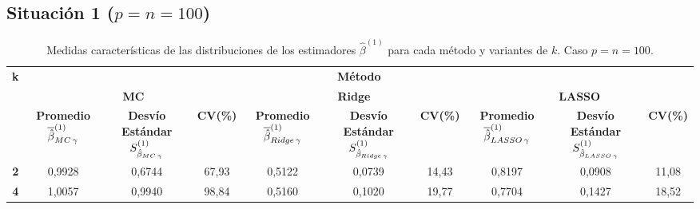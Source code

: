 \documentclass[a4paper,12pt]{report}
\begin{document}
\subsection*{Situación 1 ($p=n=100$)}
\begin{table}[H]
\centering
\caption{Medidas características de las distribuciones de los estimadores $\hat{\beta}^{(1)}$ para cada método y variantes de $k$. Caso $p=n=100$.}
\label{tab: sit 1 B 1 med std}
\footnotesize
\begin{tabular}{c|ccc|ccc|ccc}
 \multirow{3}{*}[-2em]{\textbf{k}} & \multicolumn{9}{c}{\textbf{Método}} \\[2ex]
 & \multicolumn{3}{c}{\textbf{MC}} & \multicolumn{3}{c}{\textbf{Ridge}} & \multicolumn{3}{c}{\textbf{LASSO}} \\[2ex]
 & \scriptsize\makecell{\textbf{Promedio} \\ $\overline{\hat{\beta}}_{MC \hspace{0.05cm} \gamma}^{(1)}$} & \scriptsize\makecell{\textbf{Desvío} \\ \textbf{Estándar} \\ $S_{\hat{\beta}_{MC \hspace{0.05cm} \gamma}}^{(1)}$} & \scriptsize\textbf{CV(\%)} & \scriptsize\makecell{\textbf{Promedio} \\ $\overline{\hat{\beta}}_{Ridge \hspace{0.05cm} \gamma}^{(1)}$} & \scriptsize\makecell{\textbf{Desvío} \\ \textbf{Estándar} \\ $S_{\hat{\beta}_{Ridge \hspace{0.05cm} \gamma}}^{(1)}$} & \scriptsize\textbf{CV(\%)} & \scriptsize\makecell{\textbf{Promedio} \\ $\overline{\hat{\beta}}_{LASSO \hspace{0.05cm} \gamma}^{(1)}$} & \scriptsize\makecell{\textbf{Desvío} \\ \textbf{Estándar} \\ $S_{\hat{\beta}_{LASSO \hspace{0.05cm} \gamma}}^{(1)}$} & \scriptsize\textbf{CV(\%)} \\ \hline
\textbf{2} & 0,9928 & 0,6744 & \hspace{0.05cm} 67,93 & 0,5122 & 0,0739 & 14,43 & 0,8197 & 0,0908 & \hspace{0.05cm} 11,08 \\
\textbf{4} & 1,0057 & 0,9940 & \hspace{0.05cm} 98,84 & 0,5160 & 0,1020 & 19,77 & 0,7704 & 0,1427 & \hspace{0.05cm} 18,52 \\

\end{tabular}
\end{table}
\end{document}
